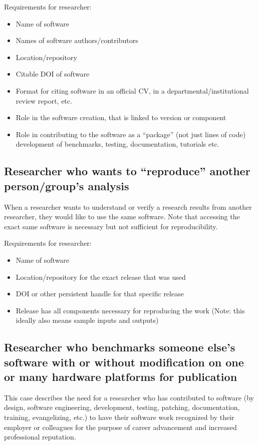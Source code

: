 \documentclass[12pt, oneside]{amsart}
\begin{document}
Requirements for researcher:
\begin{itemize}
\item Name of software
\item Names of software authors/contributors
\item Location/repository
\item Citable DOI of software
\item Format for citing software in an official CV, in a departmental/institutional review report, etc.
\item Role in the software creation, that is linked to version or component
\item Role in contributing to the software as a ``package'' (not just lines of code) development of benchmarks, testing, documentation, tutorials etc.
\end{itemize}

\subsection{Researcher who wants to ``reproduce'' another person\slash group's analysis}

When a researcher wants to understand or verify a research results from another researcher, they
would like to use the same software.  Note that accessing the exact same software is necessary but not sufficient for reproducibility.

Requirements for researcher:
\begin{itemize}
\item Name of software
\item Location/repository for the exact release that was used
\item DOI or other persistent handle for that specific release
\item Release has all components necessary for reproducing the work (Note: this ideally also means sample inputs and outputs)
\end{itemize}

\subsection{Researcher who benchmarks someone else's software with or without modification on one or many hardware platforms for publication}

This case describes the need for a researcher who has contributed to software (by design, software engineering, development, testing, patching, documentation, training, evangelizing, etc.) to have their software work recognized by their employer or colleagues for the purpose of career advancement and increased professional reputation.
\end{document}
